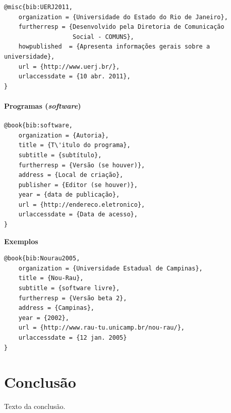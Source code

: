 \documentclass[a4paper,12pt,oneside,onecolumn,final,fleqn]{repUERJ}
\begin{document}
\noindent{}

\begin{verbatim}
@misc{bib:UERJ2011,
    organization = {Universidade do Estado do Rio de Janeiro},
    furtherresp = {Desenvolvido pela Diretoria de Comunicação 
                   Social - COMUNS},
    howpublished  = {Apresenta informações gerais sobre a universidade},
    url = {http://www.uerj.br/},
    urlaccessdate = {10 abr. 2011},
}
\end{verbatim}

\subsubsection{Programas (\textsl{software})}

\noindent{}

\begin{verbatim}
@book{bib:software,
    organization = {Autoria},
    title = {T\'itulo do programa},
    subtitle = {subtítulo},
    furtherresp = {Versão (se houver)},
    address = {Local de criação},
    publisher = {Editor (se houver)},
    year = {data de publicação},
    url = {http://endereco.eletronico},
    urlaccessdate = {Data de acesso},
}
\end{verbatim}

\noindent\textbf{Exemplos}\\

\noindent{}

\begin{verbatim}
@book{bib:Nourau2005,
    organization = {Universidade Estadual de Campinas},
    title = {Nou-Rau},
    subtitle = {software livre},
    furtherresp = {Versão beta 2},
    address = {Campinas},
    year = {2002},
    url = {http://www.rau-tu.unicamp.br/nou-rau/},
    urlaccessdate = {12 jan. 2005}
}
\end{verbatim}

\chapter*{Conclusão}

Texto da conclusão.
\end{document}
